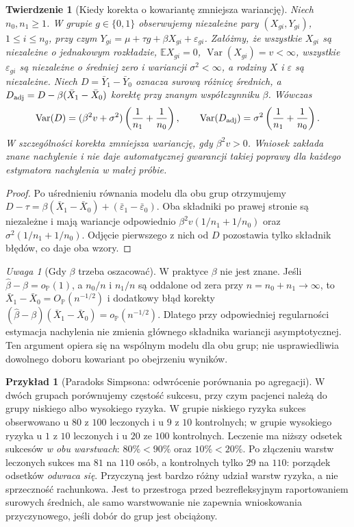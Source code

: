 \documentclass[11pt,a4paper,oneside]{report}
\numberwithin{equation}{chapter}
\theoremstyle{plain}
\newtheorem{twierdzenie}{Twierdzenie}[chapter]
\theoremstyle{definition}
\newtheorem{przyklad}{Przykład}[chapter]
\theoremstyle{remark}
\newtheorem{uwaga}{Uwaga}[chapter]
\newcommand{\Prob}{\mathbb P}
\newcommand{\E}{\mathbb E}
\newcommand{\Var}{\operatorname{Var}}
\begin{document}
\begin{twierdzenie}[Kiedy korekta o kowariantę zmniejsza wariancję]\label{thm:ancova-variance}
Niech $n_0,n_1\ge1$. W grupie $g\in\{0,1\}$ obserwujemy niezależne pary $(X_{gi},Y_{gi})$, $1\le i\le n_g$, przy czym
$Y_{gi}=\mu+\tau g+\beta X_{gi}+\varepsilon_{gi}$.
Załóżmy, że wszystkie $X_{gi}$ są niezależne o jednakowym rozkładzie, $\E X_{gi}=0$, $\Var(X_{gi})=v<\infty$, wszystkie $\varepsilon_{gi}$ są niezależne o średniej zero i wariancji $\sigma^2<\infty$, a rodziny $X$ i $\varepsilon$ są niezależne. Niech $D=\bar Y_1-\bar Y_0$ oznacza surową różnicę średnich, a $D_{\rm adj}=D-\beta(\bar X_1-\bar X_0)$ korektę przy \emph{znanym} współczynniku $\beta$. Wówczas
\[
 \Var(D)=(\beta^2v+\sigma^2)\left(\frac1{n_1}+\frac1{n_0}\right),\qquad
 \Var(D_{\rm adj})=\sigma^2\left(\frac1{n_1}+\frac1{n_0}\right).
\]
W szczególności korekta zmniejsza wariancję, gdy $\beta^2v>0$. Wniosek zakłada znane nachylenie i nie daje automatycznej gwarancji takiej poprawy dla każdego estymatora nachylenia w małej próbie.
\end{twierdzenie}
\begin{proof}
Po uśrednieniu równania modelu dla obu grup otrzymujemy
$D-\tau=\beta(\bar X_1-\bar X_0)+(\bar\varepsilon_1-\bar\varepsilon_0)$.
Oba składniki po prawej stronie są niezależne i mają wariancje odpowiednio
$\beta^2v(1/n_1+1/n_0)$ oraz $\sigma^2(1/n_1+1/n_0)$.
Odjęcie pierwszego z nich od $D$ pozostawia tylko składnik błędów, co daje oba wzory.
\end{proof}

\begin{uwaga}[Gdy $\beta$ trzeba oszacować]
W praktyce $\beta$ nie jest znane. Jeśli $\widehat\beta-\beta=o_\Prob(1)$, a $n_0/n$ i $n_1/n$ są oddalone od zera przy $n=n_0+n_1\to\infty$, to $\bar X_1-\bar X_0=O_\Prob(n^{-1/2})$ i dodatkowy błąd korekty
$(\widehat\beta-\beta)(\bar X_1-\bar X_0)=o_\Prob(n^{-1/2})$.
Dlatego przy odpowiedniej regularności estymacja nachylenia nie zmienia głównego składnika wariancji asymptotycznej. Ten argument opiera się na wspólnym modelu dla obu grup; nie usprawiedliwia dowolnego doboru kowariant po obejrzeniu wyników.
\end{uwaga}

\begin{przyklad}[Paradoks Simpsona: odwrócenie porównania po agregacji]
W dwóch grupach porównujemy częstość sukcesu, przy czym pacjenci należą do grupy niskiego albo wysokiego ryzyka. W grupie niskiego ryzyka sukces obserwowano u $80$ z $100$ leczonych i u $9$ z $10$ kontrolnych; w grupie wysokiego ryzyka u $1$ z $10$ leczonych i u $20$ ze $100$ kontrolnych. Leczenie ma niższy odsetek sukcesów \emph{w obu warstwach}: $80\%<90\%$ oraz $10\%<20\%$. Po złączeniu warstw leczonych sukces ma $81$ na $110$ osób, a kontrolnych tylko $29$ na $110$: porządek odsetków \emph{odwraca się}. Przyczyną jest bardzo różny udział warstw ryzyka, a nie sprzeczność rachunkowa. Jest to przestroga przed bezrefleksyjnym raportowaniem surowych średnich, ale samo warstwowanie nie zapewnia wnioskowania przyczynowego, jeśli dobór do grup jest obciążony.
\end{przyklad}
\end{document}
